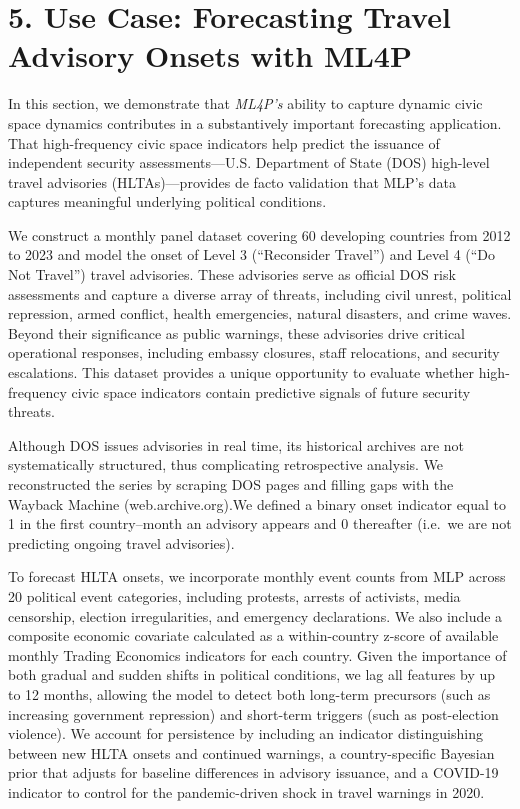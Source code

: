 \documentclass[
  letterpaper,
  DIV=11,
  numbers=noendperiod]{scrartcl}
\begin{document}
\hypertarget{sec-usecase}{%
\section{5. Use Case: Forecasting Travel Advisory Onsets with
ML4P}\label{sec-usecase}}

In this section, we demonstrate that \emph{ML4P's} ability to capture
dynamic civic space dynamics contributes in a substantively important
forecasting application. That high-frequency civic space indicators help
predict the issuance of independent security assessments---U.S.
Department of State (DOS) high-level travel advisories
(HLTAs)---provides de facto validation that MLP's data captures
meaningful underlying political conditions.

We construct a monthly panel dataset covering 60 developing countries
from 2012 to 2023 and model the onset of Level 3 (``Reconsider Travel'')
and Level 4 (``Do Not Travel'') travel advisories. These advisories
serve as official DOS risk assessments and capture a diverse array of
threats, including civil unrest, political repression, armed conflict,
health emergencies, natural disasters, and crime waves. Beyond their
significance as public warnings, these advisories drive critical
operational responses, including embassy closures, staff relocations,
and security escalations. This dataset provides a unique opportunity to
evaluate whether high-frequency civic space indicators contain
predictive signals of future security threats.

Although DOS issues advisories in real time, its historical archives are
not systematically structured, thus complicating retrospective analysis.
We reconstructed the series by scraping DOS pages and filling gaps with
the Wayback Machine (web.archive.org).We defined a binary onset
indicator equal to 1 in the first country--month an advisory appears and
0 thereafter (i.e.~we are not predicting ongoing travel advisories).

To forecast HLTA onsets, we incorporate monthly event counts from MLP
across 20 political event categories, including protests, arrests of
activists, media censorship, election irregularities, and emergency
declarations. We also include a composite economic covariate calculated
as a within-country z-score of available monthly Trading Economics
indicators for each country. Given the importance of both gradual and
sudden shifts in political conditions, we lag all features by up to 12
months, allowing the model to detect both long-term precursors (such as
increasing government repression) and short-term triggers (such as
post-election violence). We account for persistence by including an
indicator distinguishing between new HLTA onsets and continued warnings,
a country-specific Bayesian prior that adjusts for baseline differences
in advisory issuance, and a COVID-19 indicator to control for the
pandemic-driven shock in travel warnings in 2020.
\end{document}
